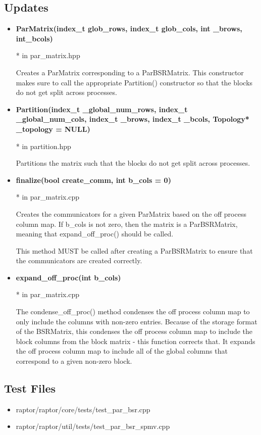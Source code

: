 \documentclass{article}
\begin{document}
\subsection*{Updates}
\begin{itemize}
    \item \textbf{ParMatrix(index\_t glob\_rows, index\_t glob\_cols, int \_brows, int\_bcols)}
    
    * in par\_matrix.hpp
    
    Creates a ParMatrix corresponding to a ParBSRMatrix. This constructor makes sure to
    call the appropriate Partition() constructor so that the blocks do not get
    split across processes.
    
    \item \textbf{Partition(index\_t \_global\_num\_rows, index\_t \_global\_num\_cols,
                    index\_t \_brows, index\_t \_bcols, Topology* \_topology = NULL)}
                    
    * in partition.hpp
    
    Partitions the matrix such that the blocks do not get split across processes.
    
    \item \textbf{finalize(bool create\_comm, int b\_cols = 0)}
    
    * in par\_matrix.cpp
    
    Creates the communicators for a given ParMatrix based on the off process column map.
    If b\_cols is not zero, then the matrix is a ParBSRMatrix, meaning that
    expand\_off\_proc() should be called.
    
    This method MUST be called after creating a ParBSRMatrix to ensure that the
    communicators are created correctly.
    
    \item \textbf{expand\_off\_proc(int b\_cols)}
    
    * in par\_matrix.cpp
    
    The condense\_off\_proc() method condenses the off process column map to only include
    the columns with non-zero entries. Because of the storage format of the
    BSRMatrix, this condenses the off process column map to include the block
    columns from the block matrix - this function corrects that. It expands the 
    off process column map to include all of the global columns that correspond
    to a given non-zero block.
\end{itemize}

\subsection*{Test Files}
\begin{itemize}
    \item raptor/raptor/core/tests/test\_par\_bsr.cpp
    \item raptor/raptor/util/tests/test\_par\_bsr\_spmv.cpp
\end{itemize}
\end{document}
